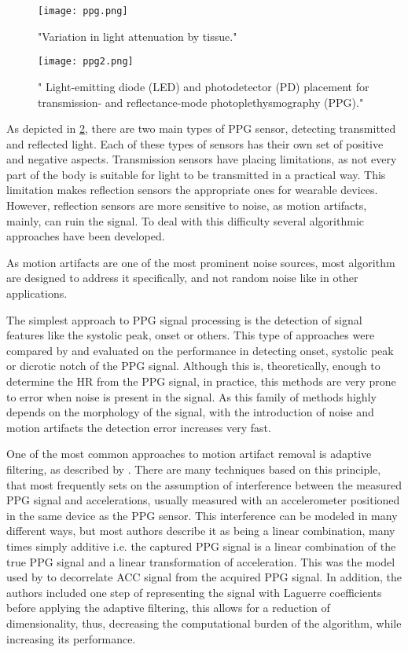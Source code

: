 \begin{figure}[!h]
	\centering
	\texttt{[image: ppg.png]}
	\caption{\citet{b_ppg_revisao} 
		"Variation in light attenuation by tissue."}
	\label{figure:ppg}
\end{figure}

\begin{figure}[!h]
	\centering
	\texttt{[image: ppg2.png]}
	\caption{\citet{b_ppg_revisao} 
		" Light-emitting diode (LED) and photodetector (PD) placement for transmission- and reflectance-mode photoplethysmography (PPG)."}
	\label{figure:ppg2}
\end{figure}

As depicted in \cref{figure:ppg2}, there are two main types of PPG sensor, detecting transmitted and reflected light. Each of these types of sensors has their own set of positive and negative aspects. Transmission sensors have placing limitations, as not every part of the body is suitable for light to be transmitted in a practical way. This limitation makes reflection sensors the appropriate ones for wearable devices. However, reflection sensors are more sensitive to noise, as motion artifacts, mainly, can ruin the signal. To deal with this difficulty several algorithmic approaches have been developed.

As motion artifacts are one of the most prominent noise sources, most algorithm are designed to address it specifically, and not random noise like in other applications.

The simplest approach to PPG signal processing is the detection of signal features like the systolic peak, onset or others. This type of approaches were compared by \citet{bvponsetblazek2010multi} and evaluated on the performance in detecting onset, systolic peak or dicrotic notch of the PPG signal. Although this is, theoretically, enough to determine the HR from the PPG signal, in practice, this methods are very prone to error when noise is present in the signal. As this family of methods highly depends on the morphology of the signal, with the introduction of noise and motion artifacts the detection error increases very fast.

One of the most common approaches to motion artifact removal is adaptive filtering, as described by \citet{b_ppg_revisao}. There are many techniques based on this principle, that most frequently sets on the assumption of interference between the measured PPG signal and accelerations, usually measured with an accelerometer positioned in the same device as the PPG sensor. This interference can be modeled in many different ways, but most authors describe it as being a linear combination, many times simply additive i.e. the captured PPG signal is a linear combination of the true PPG signal and  a linear transformation of acceleration. This was the model used by \citet{laguerrewood2006active} to decorrelate ACC signal from the acquired PPG signal. In addition, the authors included one step of representing the signal with Laguerre coefficients before applying the adaptive filtering, this allows for a reduction of dimensionality, thus, decreasing the computational burden of the algorithm, while increasing its performance.

